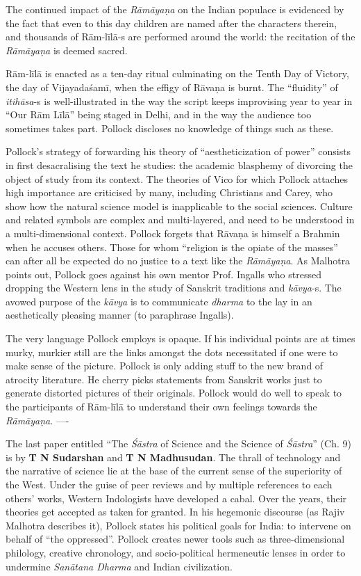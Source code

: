 The continued impact of the \textit{Rāmāyaṇa} on the Indian populace is evidenced by the fact that even to this day children are named after the characters therein, and thousands of Rām-līlā-s are performed around the world: the recitation of the \textit{Rāmāyaṇa} is deemed sacred.

Rām-līlā is enacted as a ten-day ritual culminating on the Tenth Day of Victory, the day of Vijayadaśamī, when the effigy of Rāvaṇa is burnt. The “fluidity” of \textit{itihāsa}-s is well-illustrated in the way the script keeps improvising year to year in “Our Rām Līlā” being staged in Delhi, and in the way the audience too sometimes takes part. Pollock discloses no knowledge of things such as these.

Pollock’s strategy of forwarding his theory of “aestheticization of power” consists in first desacralising the text he studies: the academic blasphemy of divorcing the object of study from its context. The theories of Vico for which Pollock attaches high importance are criticised by many, including Christians and Carey, who show how the natural science model is inapplicable to the social sciences. Culture and related symbols are complex and multi-layered, and need to be understood in a multi-dimensional context. Pollock forgets that Rāvaṇa is himself a Brahmin when he accuses others. Those for whom “religion is the opiate of the masses” can after all be expected do no justice to a text like the \textit{Rāmāyaṇa}. As Malhotra points out, Pollock goes against his own mentor Prof. Ingalls who stressed dropping the Western lens in the study of Sanskrit traditions and \textit{kāvya}-s. The avowed purpose of the \textit{kāvya} is to communicate \textit{dharma} to the lay in an aesthetically pleasing manner (to paraphrase Ingalls).

The very language Pollock employs is opaque. If his individual points are at times murky, murkier still are the links amongst the dots necessitated if one were to make sense of the picture. Pollock is only adding stuff to the new brand of atrocity literature. He cherry picks statements from Sanskrit works just to generate distorted pictures of their originals. Pollock would do well to speak to the participants of Rām-līlā to understand their own feelings towards the \textit{Rāmāyaṇa}. ----

The last paper entitled “The \textit{Śāstra} of Science and the Science of \textit{Śāstra}” (Ch. 9) is by \textbf{T N Sudarshan} and \textbf{T N Madhusudan}. The thrall of technology and the narrative of science lie at the base of the current sense of the superiority of the West. Under the guise of peer reviews and by multiple references to each others’ works, Western Indologists have developed a cabal. Over the years, their theories get accepted as taken for granted. In his hegemonic discourse (as Rajiv Malhotra describes it), Pollock states his political goals for India: to intervene on behalf of “the oppressed”. Pollock creates newer tools such as three-dimensional philology, creative chronology, and socio-political hermeneutic lenses in order to undermine \textit{Sanātana Dharma} and Indian civilization.

